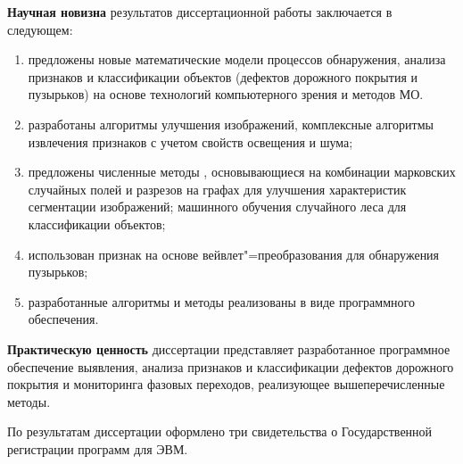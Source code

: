 \textbf{Научная новизна} результатов диссертационной работы заключается в следующем:
\begin{enumerate}
\item предложены новые математические модели процессов обнаружения, анализа признаков и классификации объектов (дефектов дорожного покрытия и пузырьков) на основе технологий компьютерного зрения и методов МО.

\item разработаны алгоритмы улучшения изображений, комплексные алгоритмы извлечения признаков с учетом свойств освещения и шума;

\item предложены численные методы , основывающиеся на комбинации марковских случайных полей и разрезов на графах для улучшения  характеристик сегментации изображений; машинного обучения случайного леса для классификации объектов;

\item использован признак на основе вейвлет"=преобразования для обнаружения пузырьков;

\item разработанные алгоритмы и методы реализованы в виде программного обеспечения.
\end{enumerate}

\textbf{Практическую ценность} диссертации представляет разработанное программное обеспечение выявления, анализа признаков и классификации дефектов дорожного покрытия и мониторинга фазовых переходов, реализующее вышеперечисленные методы.

 По результатам диссертации оформлено три свидетельства о Государственной регистрации программ для ЭВМ.


